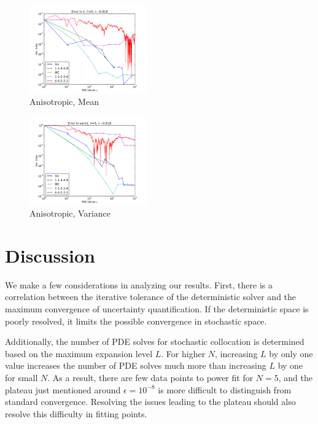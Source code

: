 \documentclass{anstrans} \usepackage{amsmath} \usepackage{amssymb}
\begin{document}
  \begin{figure}[htb] \includegraphics[width=0.45\textwidth]{../graphics/N5_h5_aniso1} \caption{Anisotropic,
    Mean} \label{aniso1} \end{figure} \begin{figure}[htb]
    \includegraphics[width=0.45\textwidth]{../graphics/N5_h5_aniso2} \caption{Anisotropic, Variance}
    \label{aniso2} \end{figure}



\section{Discussion} We make a few considerations in analyzing our results.  First, there is a correlation
between the iterative tolerance of the deterministic solver and the maximum convergence of uncertainty
quantification.  If the deterministic space is poorly resolved, it limits the possible convergence in
stochastic space.

Additionally, the number of PDE solves for stochastic collocation is determined based on the maximum expansion
level $L$.  For higher $N$, increasing $L$ by only one value increases the number of PDE solves much more than
increasing $L$ by one for small $N$.  As a result, there are few data points to power fit for $N=5$, and the
plateau just mentioned around $\epsilon=10^{-8}$ is more difficult to distinguish from standard convergence.
Resolving the issues leading to the plateau should also resolve this difficulty in fitting points.
\end{document}
